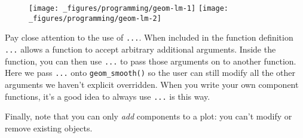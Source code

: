 \begin{Shaded}
\begin{Highlighting}[]
\StringTok{ } \StringTok{ } \NormalTok{(}\NormalTok{, }\NormalTok{), }
                     
  \NormalTok{(}  \NormalTok{, } \NormalTok{, } 
     
\NormalTok{\}}
 \NormalTok{/}\StringTok{ }\StringTok{ }
\StringTok{  }\NormalTok{() +}\StringTok{ }
\StringTok{  }\NormalTok{()}
 \NormalTok{/}\StringTok{ }\StringTok{ }
\StringTok{  }\NormalTok{() +}\StringTok{ }
\StringTok{  }\StringTok{ }\NormalTok{), } \NormalTok{, } \NormalTok{)}
\end{Highlighting}
\end{Shaded}

\begin{figure}[H]
  \centering
  \texttt{[image: \_figures/programming/geom-lm-1]}%
  \texttt{[image: \_figures/programming/geom-lm-2]}
\end{figure}

Pay close attention to the use of \texttt{...}. When included in the
function definition \texttt{...} allows a function to accept arbitrary
additional arguments. Inside the function, you can then use \texttt{...}
to pass those arguments on to another function. Here we pass
\texttt{...} onto \texttt{geom\_smooth()} so the user can still modify
all the other arguments we haven't explicit overridden. When you write
your own component functions, it's a good idea to always use
\texttt{...} is this way. 

Finally, note that you can only \emph{add} components to a plot: you
can't modify or remove existing objects.

